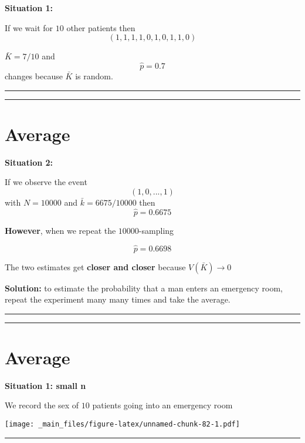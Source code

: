 \documentclass[
]{book}
\begin{document}
\textbf{Situation 1:}

If we wait for \(10\) other patients then \[(1, 1, 1, 1, 0, 1, 0, 1, 1, 0)\]

\(\bar{K}=7/10\) and \[\hat{p}=0.7\] changes because \(\bar{K}\) is random.

\begin{center}\rule{0.5\linewidth}{0.5pt}\end{center}

\begin{center}\rule{0.5\linewidth}{0.5pt}\end{center}

\hypertarget{average-5}{%
\section{Average}\label{average-5}}

\textbf{Situation 2:}

If we observe the event \[(1, 0, ..., 1)\]
with \(N=10000\) and \(\bar{k}= 6675/10000\) then \[\hat{p}= 0.6675\]

\textbf{However}, when we repeat the \(10000\)-sampling

\[\hat{p}=0.6698\]

The two estimates get \textbf{closer and closer} because \(V(\bar{K}) \rightarrow 0\)

\textbf{Solution:} to estimate the probability that a man enters an emergency room, repeat the experiment many many times and take the average.

\begin{center}\rule{0.5\linewidth}{0.5pt}\end{center}

\begin{center}\rule{0.5\linewidth}{0.5pt}\end{center}

\hypertarget{average-6}{%
\section{Average}\label{average-6}}

\textbf{Situation 1: small n}

We record the sex of \(10\) patients going into an emergency room

\texttt{[image: \_main\_files/figure-latex/unnamed-chunk-82-1.pdf]}

\begin{center}\rule{0.5\linewidth}{0.5pt}\end{center}
\end{document}
